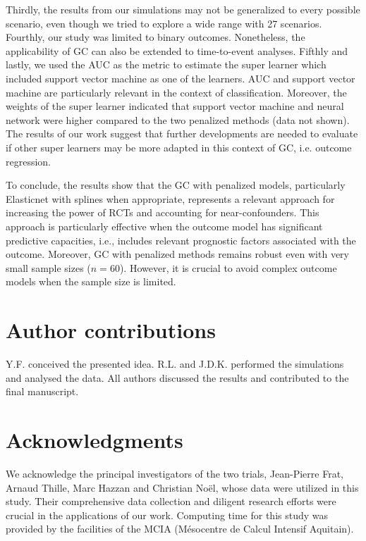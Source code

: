 \documentclass{article}
\begin{document}
Thirdly, the results from our simulations may not be generalized to every possible scenario, even though we tried to explore a wide range with 27 scenarios. Fourthly, our study was limited to binary outcomes. Nonetheless, the applicability of GC can also be extended to time-to-event analyses. \cite{chatton_g-computation_2022}
Fifthly and lastly, we used the AUC as the metric to estimate the super learner which included support vector machine as one of the learners. AUC and support vector machine are particularly relevant in the context of classification. Moreover, the weights of the super learner indicated that support vector machine and neural network were higher compared to the two penalized methods (data not shown). The results of our work suggest that further developments are needed to evaluate if other super learners may be more adapted in this context of GC, i.e. outcome regression.



To conclude, the results show that the GC with penalized models, particularly Elasticnet with splines when appropriate, represents a relevant approach for increasing the power of RCTs and accounting for  near-confounders. This approach is particularly effective when the outcome model has significant predictive capacities, i.e., includes relevant prognostic factors associated with the outcome. 
Moreover, GC with penalized methods remains robust even with very small sample sizes ($n=60$). 
However, it is crucial to avoid complex outcome models when the sample size is limited.



\section*{Author contributions}
Y.F.  conceived the presented idea.  R.L.  and J.D.K. performed the simulations and analysed the data.  All authors discussed the results and contributed to the final manuscript.

\section*{Acknowledgments}
We acknowledge the principal investigators of the two trials, Jean-Pierre Frat, Arnaud Thille, Marc Hazzan and Christian Noël, whose data were utilized in this study. Their comprehensive data collection and diligent research efforts were crucial in the applications of our work. Computing time for this study was provided by the facilities of the MCIA (Mésocentre de Calcul Intensif Aquitain).
\end{document}
